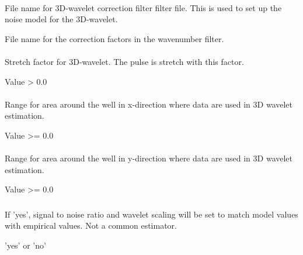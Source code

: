 \paragraph{}
 \slist
   \item \Description File name for 3D-wavelet correction filter filter file. This is used to set up the noise model for the 3D-wavelet.
   \item \Argument File name for the correction factors in the wavenumber filter.
   \item \Default
 \elist

\paragraph{}
 \slist
   \item \Description Stretch factor for 3D-wavelet. The pulse is stretch with this factor.
   \item \Argument Value > 0.0
   \item {}
\elist

\paragraph{}
 \slist
   \item \Description Range for area around the well in x-direction where data are used in 3D wavelet estimation. 
   \item \Argument Value >= 0.0
   \item {}
\elist

\paragraph{}
 \slist
   \item \Description Range for area around the well in y-direction where data are used in 3D wavelet estimation. 
   \item \Argument Value >= 0.0
   \item {}
\elist

\subsubsection{}
 \slist
   \item \Description If 'yes', signal to noise ratio and wavelet scaling will be set to match model values with empirical values. Not a common estimator.
   \item \Argument 'yes' or 'no'
   \item \Default
 \elist

